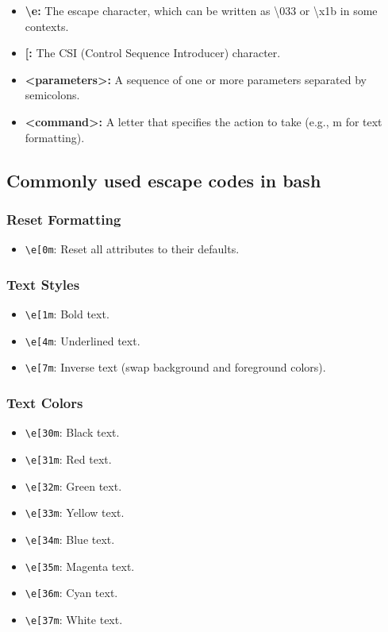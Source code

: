 \documentclass{report}
\begin{document}
    \begin{itemize}
        \item \textbf{\textbackslash e:} The escape character, which can be written as \textbackslash 033 or \textbackslash x1b in some contexts.
        \item \textbf{[:} The CSI (Control Sequence Introducer) character.
        \item \textbf{<parameters>:} A sequence of one or more parameters separated by semicolons.
        \item \textbf{<command>:} A letter that specifies the action to take (e.g., m for text formatting).
    \end{itemize}

    \bigbreak \noindent 
    \subsection{Commonly used escape codes in bash}

    \subsubsection{Reset Formatting}
    \begin{itemize}
        \item \texttt{\textbackslash e[0m}: Reset all attributes to their defaults.
    \end{itemize}

    \subsubsection{Text Styles}
    \begin{itemize}
        \item \texttt{\textbackslash e[1m}: Bold text.
        \item \texttt{\textbackslash e[4m}: Underlined text.
        \item \texttt{\textbackslash e[7m}: Inverse text (swap background and foreground colors).
    \end{itemize}

    \subsubsection{Text Colors}
    \begin{itemize}
        \item \texttt{\textbackslash e[30m}: Black text.
        \item \texttt{\textbackslash e[31m}: Red text.
        \item \texttt{\textbackslash e[32m}: Green text.
        \item \texttt{\textbackslash e[33m}: Yellow text.
        \item \texttt{\textbackslash e[34m}: Blue text.
        \item \texttt{\textbackslash e[35m}: Magenta text.
        \item \texttt{\textbackslash e[36m}: Cyan text.
        \item \texttt{\textbackslash e[37m}: White text.
    \end{itemize}
\end{document}
